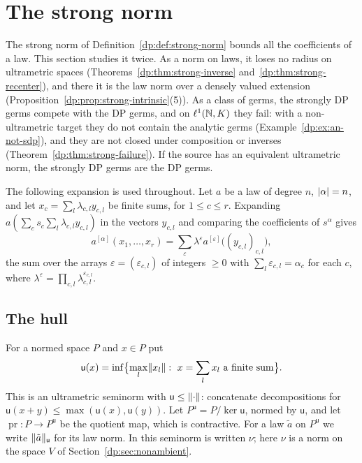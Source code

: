 \section{The strong norm}\label{dp:sec:strong}

The strong norm of Definition~\ref{dp:def:strong-norm} bounds all the coefficients of a law. This section studies it twice. As a norm on laws, it loses no radius on ultrametric spaces (Theorems~\ref{dp:thm:strong-inverse} and~\ref{dp:thm:strong-recenter}), and there it is the law norm over a densely valued extension (Proposition~\ref{dp:prop:strong-intrinsic}(5)). As a class of germs, the strongly DP germs compete with the DP germs, and on $\ell^1(\mathbb N,K)$ they fail: with a non-ultrametric target they do not contain the analytic germs (Example~\ref{dp:ex:an-not-sdp}), and they are not closed under composition or inverses (Theorem~\ref{dp:thm:strong-failure}). If the source has an equivalent ultrametric norm, the strongly DP germs are the DP germs.

The following expansion is used throughout. Let $a$ be a law of degree $n$, $\lvert \alpha\rvert=n$, and let $x_c=\sum_l\lambda_{c,l}y_{c,l}$ be finite sums, for $1\le c\le r$. Expanding $a(\sum_cs_c\sum_l\lambda_{c,l}y_{c,l})$ in the vectors $y_{c,l}$ and comparing the coefficients of $s^\alpha$ gives
\begin{equation}\label{dp:s:eq:slots}
 a^{[\alpha]}(x_1,\dots,x_r)=\sum_\varepsilon\lambda^\varepsilon a^{[\varepsilon]}\bigl((y_{c,l})_{c,l}\bigr),
\end{equation}
the sum over the arrays $\varepsilon=(\varepsilon_{c,l})$ of integers $\ge0$ with $\sum_l\varepsilon_{c,l}=\alpha_c$ for each $c$, where $\lambda^\varepsilon=\prod_{c,l}\lambda_{c,l}^{\varepsilon_{c,l}}$.

\subsection{The hull}\label{dp:s:ssec-hull}

\begin{definition}\label{dp:def:hull}
For a normed space $P$ and $x\in P$ put
\[
 \mathsf u(x)=\inf\bigl\{\max_l\lVert x_l\rVert:\ x=\sum_lx_l\text{ a finite sum}\bigr\}.
\]
This is an ultrametric seminorm with $\mathsf u\le\lVert \cdot\rVert$: concatenate decompositions for $\mathsf u(x+y)\le\max(\mathsf u(x),\mathsf u(y))$. Let $P^{\mathsf u}=P/\ker\mathsf u$, normed by $\mathsf u$, and let $\operatorname{pr}\colon P\to P^{\mathsf u}$ be the quotient map, which is contractive. For a law $\tilde a$ on $P^{\mathsf u}$ we write $\lVert \tilde a\rVert_{\mathsf u}$ for its law norm. In \cite[proof of Theorem~14.39(4)]{I} this seminorm is written $\nu$; here $\nu$ is a norm on the space $V$ of Section~\ref{dp:sec:nonambient}.
\end{definition}

